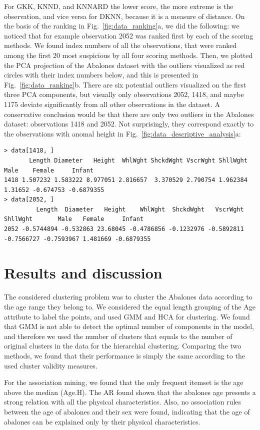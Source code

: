 \documentclass[10pt, paper=a4]{article}
\begin{document}
For GKK, KNND, and KNNARD the lower score, the more extreme is the observation,
and vice versa for DKNN, because it is a measure of distance.  On the basis of
the ranking in Fig.~\ref{fig:data_ranking}a, we did the following: we noticed
that for example observation 2052 was ranked first by each of the scoring
methods.  We found index numbers of all the observations, that were ranked among
the first 20 most suspicious by all four scoring methods.  Then, we plotted the
PCA projection of the Abalones dataset with the outliers visualized as red
circles with their index numbers below, and this is presented in
Fig.~\ref{fig:data_ranking}b.  There are six potential outliers visualized on
the first three PCA components, but visually only observations 2052, 1418, and
maybe 1175 deviate significantly from all other observations in the dataset.  A
conservative conclusion would be that there are only two outliers in the
Abalones dataset: observations 1418 and 2052.  Not surprisingly, they correspond
exactly to the observations with anomal height in
Fig.~\ref{fig:data_descriptive_analysis}a:
\begin{verbatim}
> data[1418, ]
       Length Diameter   Height  WhlWght ShckdWght VscrWght ShllWght    Male    Female     Infant
1418 1.507232 1.583222 8.977051 2.816657  3.370529 2.790754 1.962384 1.31652 -0.674753 -0.6879355
> data[2052, ]
         Length  Diameter   Height    WhlWght  ShckdWght   VscrWght   ShllWght       Male   Female     Infant
2052 -0.5744894 -0.532863 23.68045 -0.4786856 -0.1232976 -0.5892811 -0.7566727 -0.7593967 1.481669 -0.6879355
\end{verbatim}

\section{Results and discussion}
\label{sec:results_and_discussion}
The considered clustering problem was to cluster the Abalones data according to
the age range they belong to.  We considered the equal length grouping of the
Age attribute to label the points, and used GMM and HCA for clustering.  We
found that GMM is not able to detect the optimal number of components in the
model, and therefore we used the number of clusters that equals to the number of
original clusters in the data for the hierarchial clustering.  Comparing the two
methods, we found that their performance is simply the same according to the
used cluster validity measures.

For the association mining, we found that the only frequent itemset is the age
above the median (Age.H).  The AR found shown that the abalones age presents a
strong relation with all the physical characteristics.  Also, no association
rules between the age of abalones and their sex were found, indicating that the
age of abalones can be explained only by their physical characteristics.
\end{document}
